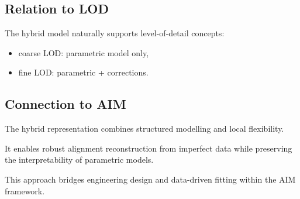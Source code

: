 \subsection{Relation to LOD}

The hybrid model naturally supports level-of-detail concepts:
\begin{itemize}
\item coarse LOD: parametric model only,
\item fine LOD: parametric + corrections.
\end{itemize}


\subsection{Connection to AIM}

\begin{summary}
The hybrid representation combines structured modelling and local
flexibility.

It enables robust alignment reconstruction from imperfect data while
preserving the interpretability of parametric models.

This approach bridges engineering design and data-driven fitting within
the AIM framework.
\end{summary}
